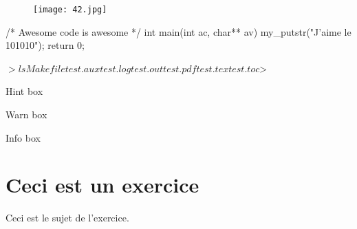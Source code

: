\documentclass{42}
\begin{document}
\begin{figure}[ht!]
  \centering
  \texttt{[image: 42.jpg]}
\end{figure}


\newpage

\begin{42ccode}
/* Awesome code is awesome */
int		main(int ac, char** av)
{
	my_putstr("J'aime le 101010");
        return 0;
}
\end{42ccode}

\begin{42console}
$>ls
Makefile  test.aux  test.log  test.outtest.pdf  test.tex  test.toc
$>
\end{42console}


\hint
{
	Hint box
}

\warn
{
	Warn box
}

\info
{
	Info box
}

\chapter{Ceci est un exercice}


\makeheaderbasic

Ceci est le sujet de l'exercice.

\end{document}

